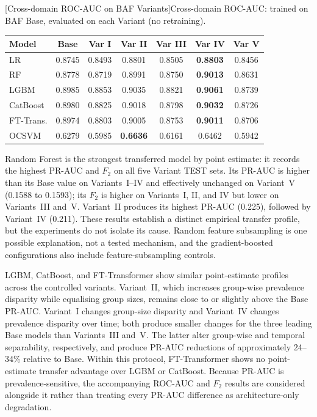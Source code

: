 \noindent\begin{minipage}{\linewidth}\centering
{}[Cross-domain ROC-AUC on BAF Variants]{Cross-domain ROC-AUC: trained on BAF Base, evaluated on each Variant (no retraining).}
\label{tab:crossdomain_rocauc}
\begin{tabular}{l c c c c c c}
\toprule
Model & Base & Var I & Var II & Var III & Var IV & Var V \\
\midrule
LR         & 0.8745 & 0.8493 & 0.8801 & 0.8505 & \textbf{0.8803} & 0.8456 \\
RF         & 0.8778 & 0.8719 & 0.8991 & 0.8750 & \textbf{0.9013} & 0.8631 \\
LGBM       & 0.8985 & 0.8853 & 0.9035 & 0.8821 & \textbf{0.9061} & 0.8739 \\
CatBoost   & 0.8980 & 0.8825 & 0.9018 & 0.8798 & \textbf{0.9032} & 0.8726 \\
FT-Trans.  & 0.8974 & 0.8803 & 0.9005 & 0.8753 & \textbf{0.9011} & 0.8706 \\
OCSVM      & 0.6279 & 0.5985 & \textbf{0.6636} & 0.6161 & 0.6462 & 0.5942 \\
\bottomrule
\end{tabular}
\end{minipage}

Random Forest is the strongest transferred model by point estimate: it records the highest PR-AUC and $F_2$ on all five Variant TEST sets. Its PR-AUC is higher than its Base value on Variants~I--IV and effectively unchanged on Variant~V (0.1588 to 0.1593); its $F_2$ is higher on Variants~I, II, and IV but lower on Variants~III and~V. Variant~II produces its highest PR-AUC (0.225), followed by Variant~IV (0.211). These results establish a distinct empirical transfer profile, but the experiments do not isolate its cause. Random feature subsampling is one possible explanation, not a tested mechanism, and the gradient-boosted configurations also include feature-subsampling controls.

LGBM, CatBoost, and FT-Transformer show similar point-estimate profiles across the controlled variants. Variant~II, which increases group-wise prevalence disparity while equalising group sizes, remains close to or slightly above the Base PR-AUC. Variant~I changes group-size disparity and Variant~IV changes prevalence disparity over time; both produce smaller changes for the three leading Base models than Variants~III and~V. The latter alter group-wise and temporal separability, respectively, and produce PR-AUC reductions of approximately 24--34\% relative to Base. Within this protocol, FT-Transformer shows no point-estimate transfer advantage over LGBM or CatBoost. Because PR-AUC is prevalence-sensitive, the accompanying ROC-AUC and $F_2$ results are considered alongside it rather than treating every PR-AUC difference as architecture-only degradation.


